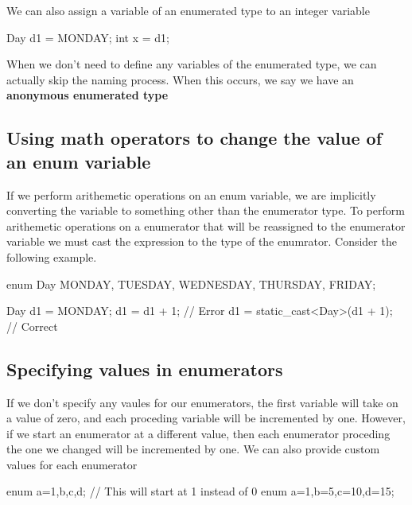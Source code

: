\documentclass{report}
\begin{document}
    \bigbreak \noindent 
    We can also assign a variable of an enumerated type to an integer variable
    \bigbreak \noindent 
    
    \begin{cppcode}
Day d1 = MONDAY;
int x = d1;
    \end{cppcode}
    
    \bigbreak \noindent 
    When we don't need to define any variables of the enumerated type, we can actually skip the naming process. When this occurs, we say we have an \textbf{anonymous enumerated type}
    \bigbreak \noindent 
    \subsection{Using math operators to change the value of an enum variable}
    \bigbreak \noindent
    If we perform arithemetic operations on an enum variable, we are implicitly converting the variable to something other than the enumerator type. To perform arithemetic operations on a enumerator that will be reassigned to the enumerator variable we must cast the expression to the type of the enumrator. Consider the following example.
    \bigbreak \noindent 
    
    \begin{cppcode}
enum Day { MONDAY, TUESDAY, WEDNESDAY, THURSDAY, FRIDAY};

Day d1 = MONDAY;
d1 = d1 + 1; // Error
d1 = static_cast<Day>(d1 + 1); // Correct
    \end{cppcode}
    
    \bigbreak \noindent 
    \subsection{Specifying values in enumerators}
    \bigbreak \noindent 
    If we don't specify any vaules for our enumerators, the first variable will take on a value of zero, and each proceding variable will be incremented by one. However, if we start an enumerator at a different value, then each enumerator proceding the one we changed will be incremented by one.
    \bigbreak \noindent 
    We can also provide custom values for each enumerator
    \bigbreak \noindent 
    \begin{cppcode}
enum {a=1,b,c,d}; // This will start at 1 instead of 0
enum {a=1,b=5,c=10,d=15}; 
    \end{cppcode}
    
    \bigbreak \noindent 
\end{document}
